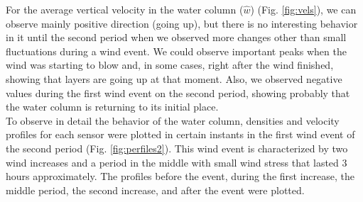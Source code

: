 \documentclass[tesis.tex]{subfiles}
\begin{document}
    For the average vertical velocity in the water column ($\hat{w}$) (Fig. \ref{fig:vels}), we can observe mainly positive direction (going up), but there is no interesting behavior in it until the second period when we observed more changes other than small fluctuations during a wind event. We could observe important peaks when the wind was starting to blow and, in some cases, right after the wind finished, showing that layers are going up at that moment. Also, we observed negative values during the first wind event on the second period, showing probably that the water column is returning to its initial place.\\
    
    To observe in detail the behavior of the water column, densities and velocity profiles for each sensor were plotted in certain instants in the first wind event of the second period (Fig. \ref{fig:perfiles2}). This wind event is characterized by two wind increases and a period in the middle with small wind stress that lasted 3 hours approximately. The profiles before the event, during the first increase, the middle period, the second increase, and after the event were plotted.\\

    \newpage
\end{document}
